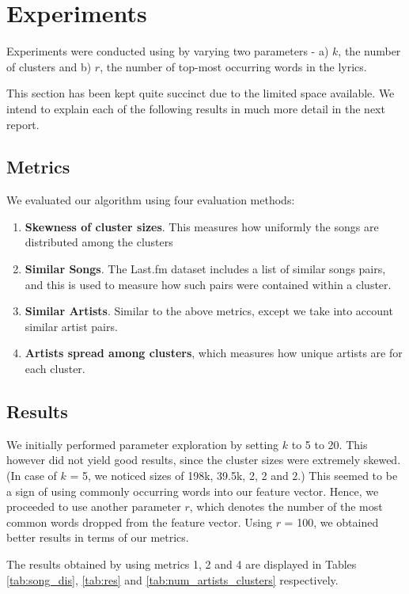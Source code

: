\documentclass[10pt,a4paper]{scrartcl}
\begin{document}
  \section{Experiments}
  Experiments were conducted using by varying two parameters - a) $k$, the number
  of clusters and b) $r$, the number of top-most occurring words in the lyrics.
  
  This section has been kept quite succinct due to the limited space available.
  We intend to explain each of the following results in much more detail in the next report.
  
  \subsection{Metrics}
  We evaluated our algorithm using four evaluation methods:
  \begin{enumerate}
  \item \textbf{Skewness of cluster sizes}. This measures how uniformly the songs are distributed among the clusters
  \item \textbf{Similar Songs}. The Last.fm dataset includes a list of similar songs pairs, and this is used to measure how such pairs were contained within a cluster.
  \item \textbf{Similar Artists}. Similar to the above metrics, except we take into account similar artist pairs.
  \item \textbf{Artists spread among clusters}, which measures how unique artists are for each cluster.
  \end{enumerate}
    
  \subsection{Results}
  We initially performed parameter exploration by setting $k$ to 5 to 20.
  This however did not yield good results, since the cluster sizes were extremely skewed.
  (In case of $k$ = 5, we noticed sizes of 198k, 39.5k, 2, 2 and 2.)
  This seemed to be a sign of using commonly occurring words into our feature vector.
  Hence, we proceeded to use another parameter $r$, which denotes the number of the most common words dropped from the feature vector.
  Using $r$ = 100, we obtained better results in terms of our metrics.
  
  The results obtained by using metrics 1, 2 and 4 are displayed in Tables \ref{tab:song_dis}, \ref{tab:res} and \ref{tab:num_artists_clusters} respectively.
  
\end{document}
